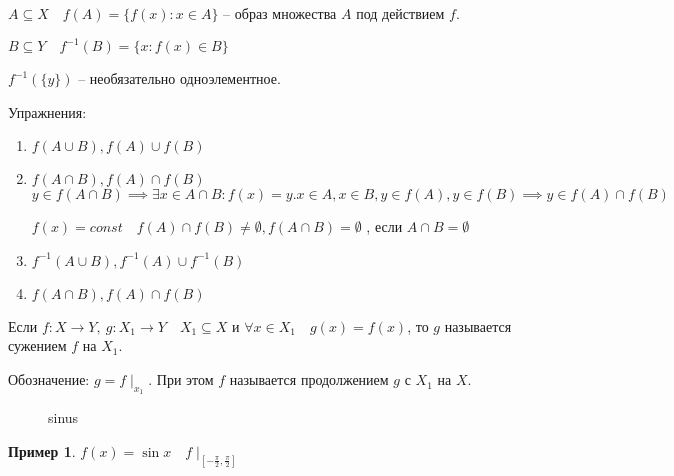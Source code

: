\documentclass{book}
\renewcommand\O{\ensuremath{\emptyset}}
\theoremstyle{definition}
\newtheorem*{example}{Пример}
\begin{document}
    $A\subseteq X\quad f(A) = \{f(x): x\in A\}$ -- образ множества $A$ под действием $f$.

    $B\subseteq Y\quad f^{-1}(B) = \{x:f(x)\in B\}$

    $f^{-1}(\{y\})$ -- необязательно одноэлементное.

    Упражнения:
    \begin{enumerate}
        \item $f(A\cup B), f(A)\cup f(B) $
        \item $f(A\cap B), f(A) \cap f(B)$
        $y\in f(A\cap B) \implies  \exists x\in A\cap B:f(x) = y. x\in A, x\in B, y\in f(A), y\in f(B) \implies  y\in f(A)\cap f(B)$

        $f(x) = const\quad f(A)\cap f(B)\neq \O , f(A\cap B) = \O$ , если $A\cap B = \O $
        \item $f^{-1}(A\cup B), f^{-1}(A)\cup f^{-1}(B)$
        \item $f(A\cap B), f(A) \cap f(B)$
    \end{enumerate}

    \begin{definition}
        Если $f:X\to Y,\ g:X_1\to Y\quad X_1\subseteq X $ и  $\forall x\in X_1 \quad g(x) = f(x)$, то $g$ называется сужением $f$ на $X_1$.

        Обозначение: $g = f\mid_{x_1}$.
        При этом $f$ называется продолжением $g$ с $X_1$ на $X$.
    \end{definition}

    \begin{figure}[h]
        \centering
        \caption{sinus}
        \label{sinus}
    \end{figure}

    \begin{example}
        $f(x) = \sin x\quad f\mid_{[-\frac{\pi}{2}, \frac{\pi}{2}]}$
    \end{example}
   
\end{document}
